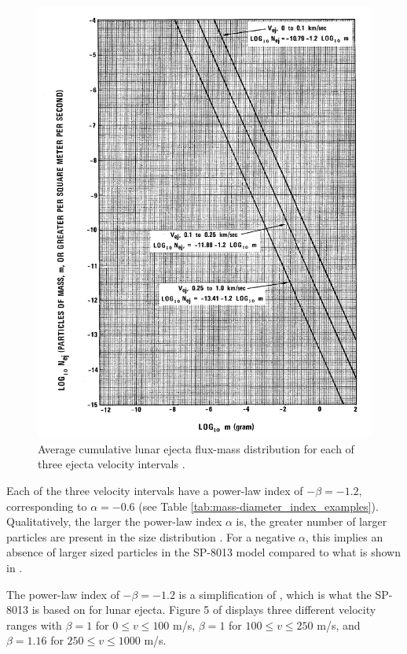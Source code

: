 \documentclass{article}
\begin{document}
\begin{figure}[!htb]
	\centering
	\includegraphics[width=1.0\linewidth]{NASA-SP-8013-Fig10-flux-mass-distribution.PNG}
	\caption{Average cumulative lunar ejecta flux-mass distribution for each of three ejecta velocity intervals \citep{cour1969meteoroid}.}\label{fig:NASA-SP-8013-Fig10-flux-mass-distribution}
\end{figure}

Each of the three velocity intervals have a power-law index of $-\beta = -1.2$, corresponding to $\alpha=-0.6$ (see Table \ref{tab:mass-diameter_index_examples}). Qualitatively, the larger the power-law index $\alpha$ is, the greater number of larger particles are present in the size distribution \citep[e.g.,][]{koschny2001impacts_mass,bierhaus2018secondary}. For a negative $\alpha$, this implies an absence of larger sized particles in the SP-8013 model compared to what is shown in \cite{koschny2001impacts_mass}.

The power-law index of $-\beta = -1.2$ is a simplification of \cite{zook1967problem}, which is what the SP-8013 is based on for lunar ejecta. Figure 5 of \cite{zook1967problem} displays three different velocity ranges with $\beta = 1$ for $0 \le v \le 100$ m/s, $\beta = 1$ for $100 \le v \le 250$ m/s, and $\beta = 1.16$ for $250 \le v \le 1000$ m/s.
\end{document}
